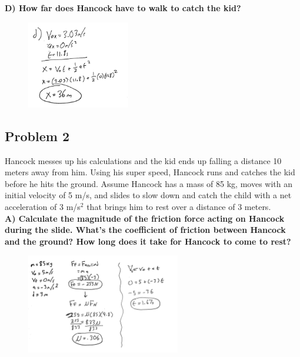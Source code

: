 \documentclass[a4paper,12pt]{article}
\begin{document}
\noindent\textbf{D) How far does Hancock have to walk to catch the kid?} \\

\vspace{-0.5cm}

\begin{figure}[H]
    \centering
    \includegraphics[width=0.4\textwidth]{U2_P1_D} %
\end{figure}

\subsection{Problem 2}

Hancock messes up his calculations and the kid ends up falling a distance 10 meters away from him. Using his super speed, Hancock runs and catches the kid before he hits the ground. Assume Hancock has a mass of 85 kg, moves with an initial velocity of 5 m/s, and slides to slow down and catch the child with a net acceleration of 3 m/s$^2$ that brings him to rest over a distance of 3 meters. 
\\

\noindent\textbf{A) Calculate the magnitude of the friction force acting on Hancock during the slide. What's the coefficient of friction between Hancock and the ground? How long does it take for Hancock to come to rest?} \\


\begin{figure}[H]
    \centering
    \includegraphics[width=0.6\textwidth]{U2_P2_A.jpg} %
\end{figure}
\end{document}
